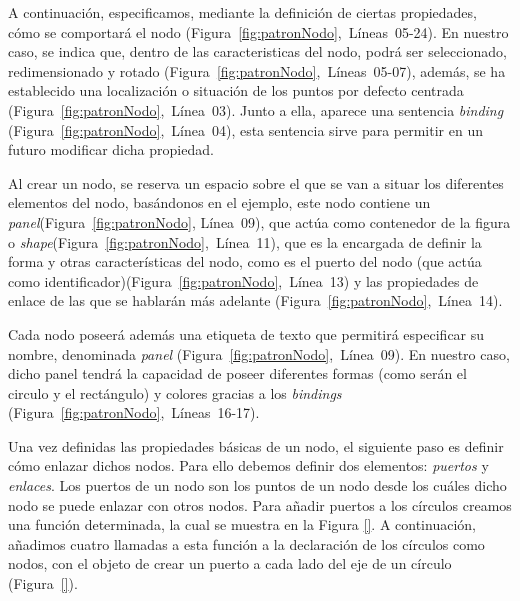A continuación, especificamos, mediante la definición de ciertas propiedades, cómo se comportará el nodo (Figura~\ref{fig:patronNodo},~Líneas~05-24). En nuestro caso, se indica que, dentro de las caracteristicas del nodo, podrá ser seleccionado, redimensionado y rotado (Figura~\ref{fig:patronNodo},~Líneas~05-07), además, se ha establecido una localización o situación de los puntos por defecto centrada (Figura~\ref{fig:patronNodo},~Línea~03). Junto a ella, aparece una sentencia  \emph{binding} (Figura~\ref{fig:patronNodo},~Línea~04), esta sentencia sirve para permitir en un futuro modificar dicha propiedad.

Al crear un nodo, se reserva un espacio sobre el que se van a situar los diferentes elementos del nodo, basándonos en el ejemplo, este nodo contiene un \emph{panel}(Figura~\ref{fig:patronNodo}, Línea~09), que actúa como contenedor de la figura o \emph{shape}(Figura~\ref{fig:patronNodo},~Línea~11), que es la encargada de definir la forma y otras características del nodo, como es el puerto del nodo (que actúa como identificador)(Figura~\ref{fig:patronNodo},~Línea~13) y las propiedades de enlace de las que se hablarán más adelante (Figura~\ref{fig:patronNodo},~Línea~14).

Cada nodo poseerá además una etiqueta de texto que permitirá especificar su nombre, denominada \emph{panel} (Figura~\ref{fig:patronNodo},~Línea~09). En nuestro caso, dicho panel tendrá la capacidad de poseer diferentes formas (como serán el circulo y el rectángulo) y colores gracias a los \emph{bindings} (Figura~\ref{fig:patronNodo},~Líneas~16-17). 

Una vez definidas las propiedades básicas de un nodo, el siguiente paso es definir cómo enlazar dichos nodos. Para ello debemos definir dos elementos: \emph{puertos} y \emph{enlaces}. Los puertos de un nodo son los puntos de un nodo desde los cuáles dicho nodo se puede enlazar con otros nodos. Para añadir puertos a los círculos creamos una función determinada, la cual se muestra en la Figura \ref{}. %
A continuación, añadimos cuatro llamadas a esta función a la declaración de los círculos como nodos, con el objeto de crear un puerto a cada lado del eje de un círculo (Figura~\ref{}).


